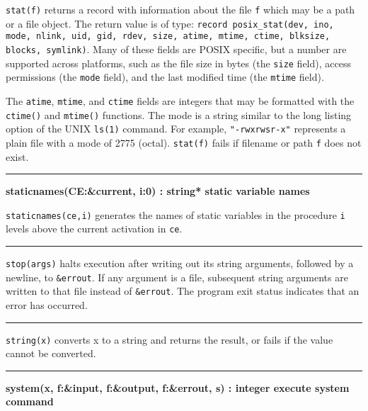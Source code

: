 \noindent
{}\texttt{stat(f)} returns a record
with information about the file \texttt{f} which may be a path or a
file object. The return value is of type: \texttt{record
posix\_stat(dev, ino, mode, nlink, uid, gid, rdev, size, atime, mtime,
ctime, blksize, blocks, symlink)}. Many of these fields are POSIX
specific, but a number are supported across platforms, such as the
file size in bytes (the \texttt{size} field), access
permissions (the \texttt{mode} field), and the last modified time (the
\texttt{mtime} field).

The \texttt{atime}, \texttt{mtime}, and \texttt{ctime} fields are
integers that may be formatted with the \texttt{ctime()} and
\texttt{mtime()} functions. The mode is a string similar to the long
listing option of the UNIX \texttt{ls(1)} command. For example,
\texttt{"-rwxrwsr-x"} represents a plain
file with a mode of 2775 (octal). \texttt{stat(f)} fails if filename or
path \texttt{f} does not exist.

\bigskip\hrule\vspace{0.1cm}
\noindent
{\bf staticnames(CE:\&current, i:0) : string* \hfill static variable names}

\noindent
{}\texttt{staticnames(ce,i)} generates the names of static
variables in the procedure \texttt{i} levels above the current
activation in \texttt{ce}.

\bigskip\hrule\vspace{0.1cm}

\noindent
{}\texttt{stop(args)} halts execution after
writing out its string arguments, followed by a newline, to
\texttt{\&errout}. If any argument is a file, subsequent string
arguments are written to that file instead of \texttt{\&errout}. The
program exit status indicates that an error has occurred.

\bigskip\hrule\vspace{0.1cm}

\noindent
{}\texttt{string(x)} converts x
to a string and returns the result, or fails if the value cannot be
converted.

\bigskip\hrule\vspace{0.1cm}
\noindent
{\bf system(x, f:\&input, f:\&output, f:\&errout, s) : integer \hfill 
execute system command}

